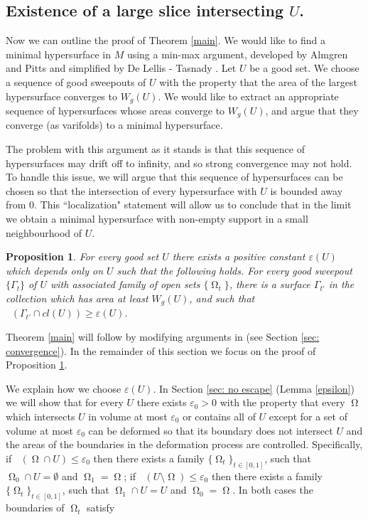 \documentclass[12pt]{amsart}
\newtheorem{proposition}[theorem]{Proposition}
\DeclareMathOperator{\Hn}{\mathcal{H}^n}
\DeclareMathOperator{\Hnn}{\mathcal{H}^{n+1}}
\DeclareMathOperator{\Om}{\Omega}
\theoremstyle{definition}
\begin{document}
\subsection{Existence of a large slice intersecting $U$.}
Now we can outline the proof of Theorem \ref*{main}.
We would like to find a minimal hypersurface in $M$ using a min-max argument, 
developed by Almgren \cite{Al} and Pitts \cite{Pi} and 
simplified by De Lellis - Tasnady \cite{DT}.
Let $U$ be a good set.
We choose a sequence of good sweepouts of $U$ with the property
that the area of the largest hypersurface converges to $W_g(U)$.
We would like to extract an appropriate sequence of hypersurfaces whose areas converge
to $W_g(U)$, and argue that they converge (as varifolds) to a minimal hypersurface.

The problem with this argument as it stands is that this sequence 
of hypersurfaces may drift off to infinity,
and so strong convergence may not hold.  
 To handle this issue, we will argue that this sequence
of hypersurfaces can be chosen so that the intersection of every hypersurface 
with $U$ is bounded away from $0$.  
This ``localization" statement will allow us to conclude
that in the limit we obtain a minimal hypersurface with non-empty support in a small neighbourhood of $U$.

\begin{proposition}
	\label{prop:intersection_U}
	For every good set $U$ there exists a positive constant $\varepsilon(U)$ which depends only on $U$ such that the following holds.
	For every good sweepout $\{ \Gamma_t \}$ of $U$ with associated family of open sets $\{ \Om_t \}$, 
	there is a surface $\Gamma_{t'}$ in the collection
	which has area at least $W_g(U)$, and such that $\Hn( \Gamma_{t'} \cap cl(U) ) \geq \varepsilon(U)$.
\end{proposition}

Theorem \ref*{main} will follow  
by modifying arguments in \cite{DT} (see Section \ref*{sec: convergence}).
In the remainder of this section we focus 
on the proof of Proposition \ref*{prop:intersection_U}.

We explain how we choose $\varepsilon(U)$.
In Section \ref*{sec: no escape} (Lemma \ref*{epsilon}) we will show that for every $U$ there exists 
$\varepsilon_0>0$ with the property that every $\Om$
which intersects $U$ in volume at most $\varepsilon_0$
or contains all of $U$ except for a set of volume at most $\varepsilon_0$
can be deformed so that its boundary does not intersect $U$ 
and the areas of the boundaries in the deformation process are controlled.
Specifically, if $\Hnn(\Om \cap U) \leq \varepsilon_0$ then there exists a family
$\{ \Om_t \}_{t \in [0,1]}$, such that
$\Om_0 \cap U = \emptyset$ and $\Om_1 = \Om$;
if $\Hnn(U \setminus \Om) \leq \varepsilon_0$
then there exists a family
$\{ \Om_t \}_{t \in [0,1]}$, such that
$\Om_1 \cap U = U$ and $\Om_0 = \Om$. In both cases the 
boundaries of $\Om_t$ satisfy
\end{document}
